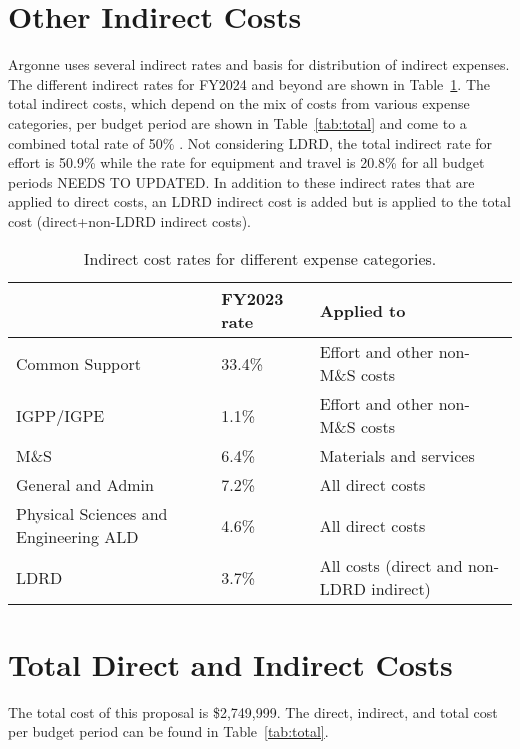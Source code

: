 \documentclass[letter, USenglish, 11pt, subfigure]{article}
\begin{document}
\section{Other Indirect Costs}
\label{subsec:otherIndirects}
Argonne uses several indirect rates and basis for distribution of indirect expenses. The different indirect rates for FY2024 and beyond are shown in Table~\ref{tab:indirectRates}. The total indirect costs, which depend on the mix of costs from various expense categories, per budget period are shown in Table~\ref{tab:total} and come to a combined total rate of { \color{red} 50\% . Not considering LDRD, the total indirect rate for effort is 50.9\% while the rate for equipment and travel is 20.8\% for all budget periods NEEDS TO UPDATED}. In addition to these indirect rates that are applied to direct costs, an LDRD indirect cost is added but is applied to the total cost (direct+non-LDRD indirect costs).

\begin{table}[!htpb]
  \begin{center}  
    \caption{Indirect cost rates for different expense categories.}
    \label{tab:indirectRates}
    \begin{tabular}{lll}
      \hline
      {} & FY2023 rate & Applied to  \\
      \hline
      Common Support & 33.4\% & Effort and other non-M\&S costs\\
      IGPP/IGPE & 1.1\% &  Effort and other non-M\&S costs \\
      M\&S & 6.4\% & Materials and services\\
      General and Admin & 7.2\% & All direct costs\\
      Physical Sciences and Engineering ALD & 4.6\% & All direct costs\\
      LDRD & 3.7\% & All costs (direct and non-LDRD indirect)\\
      \hline
    \end{tabular}
  \end{center}
\end{table}

%   
\section{Total Direct and Indirect Costs}
\label{subsec:totalCosts}
The total cost of this proposal is \$2,749,999. The direct, indirect, and total cost per budget period can be found in Table~\ref{tab:total}.
\end{document}
